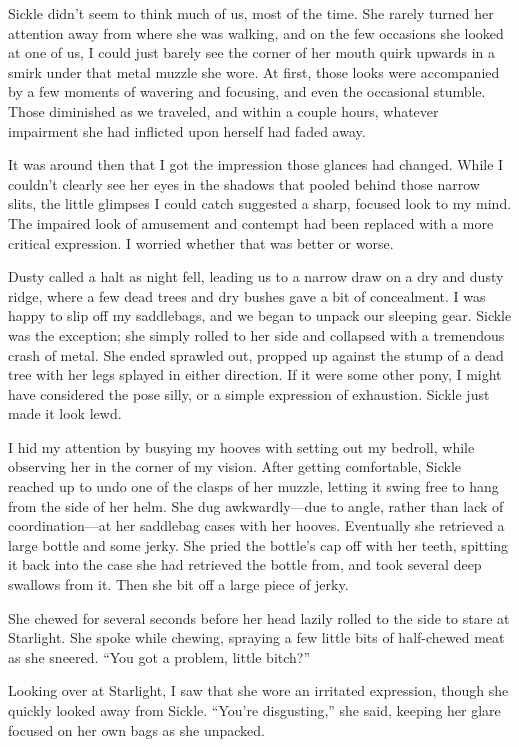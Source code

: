 Sickle didn’t seem to think much of us, most of the time. She rarely turned her attention away from where she was walking, and on the few occasions she looked at one of us, I could just barely see the corner of her mouth quirk upwards in a smirk under that metal muzzle she wore. At first, those looks were accompanied by a few moments of wavering and focusing, and even the occasional stumble. Those diminished as we traveled, and within a couple hours, whatever impairment she had inflicted upon herself had faded away.

It was around then that I got the impression those glances had changed. While I couldn’t clearly see her eyes in the shadows that pooled behind those narrow slits, the little glimpses I could catch suggested a sharp, focused look to my mind. The impaired look of amusement and contempt had been replaced with a more critical expression. I worried whether that was better or worse.

Dusty called a halt as night fell, leading us to a narrow draw on a dry and dusty ridge, where a few dead trees and dry bushes gave a bit of concealment. I was happy to slip off my saddlebags, and we began to unpack our sleeping gear. Sickle was the exception; she simply rolled to her side and collapsed with a tremendous crash of metal. She ended sprawled out, propped up against the stump of a dead tree with her legs splayed in either direction. If it were some other pony, I might have considered the pose silly, or a simple expression of exhaustion. Sickle just made it look lewd.

I hid my attention by busying my hooves with setting out my bedroll, while observing her in the corner of my vision. After getting comfortable, Sickle reached up to undo one of the clasps of her muzzle, letting it swing free to hang from the side of her helm. She dug awkwardly—due to angle, rather than lack of coordination—at her saddlebag cases with her hooves. Eventually she retrieved a large bottle and some jerky. She pried the bottle’s cap off with her teeth, spitting it back into the case she had retrieved the bottle from, and took several deep swallows from it. Then she bit off a large piece of jerky.

She chewed for several seconds before her head lazily rolled to the side to stare at Starlight. She spoke while chewing, spraying a few little bits of half-chewed meat as she sneered. “You got a problem, little bitch?”

Looking over at Starlight, I saw that she wore an irritated expression, though she quickly looked away from Sickle. “You’re disgusting,” she said, keeping her glare focused on her own bags as she unpacked.

